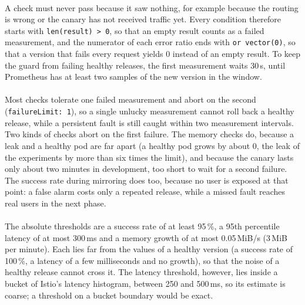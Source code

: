 \paragraph{} A check must never pass because it saw nothing, for example because the routing is wrong or the canary has not received traffic yet. Every condition therefore starts with \texttt{len(result) > 0}, so that an empty result counts as a failed measurement, and the numerator of each error ratio ends with \texttt{or vector(0)}, so that a version that fails every request yields 0 instead of an empty result. To keep the guard from failing healthy releases, the first measurement waits 30\,s, until Prometheus has at least two samples of the new version in the window.

\paragraph{} Most checks tolerate one failed measurement and abort on the second (\texttt{failureLimit:~1}), so a single unlucky measurement cannot roll back a healthy release, while a persistent fault is still caught within two measurement intervals. Two kinds of checks abort on the first failure. The memory checks do, because a leak and a healthy pod are far apart (a healthy pod grows by about 0, the leak of the experiments by more than six times the limit), and because the canary lasts only about two minutes in development, too short to wait for a second failure. The success rate during mirroring does too, because no user is exposed at that point: a false alarm costs only a repeated release, while a missed fault reaches real users in the next phase.

\paragraph{} The absolute thresholds are a success rate of at least 95\,\%, a 95th percentile latency of at most 300\,ms and a memory growth of at most 0.05\,MiB/s (3\,MiB per minute). Each lies far from the values of a healthy version (a success rate of 100\,\%, a latency of a few milliseconds and no growth), so that the noise of a healthy release cannot cross it. The latency threshold, however, lies inside a bucket of Istio's latency histogram, between 250 and 500\,ms, so its estimate is coarse; a threshold on a bucket boundary would be exact.

